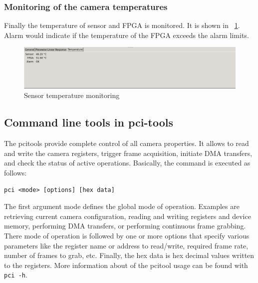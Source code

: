 \subsubsection{Monitoring of the camera temperatures}

Finally the temperature of sensor and FPGA is monitored. It is shown in  \figurename~\ref{ufo_gui_temp_bar}. Alarm would indicate if the temperature of the FPGA exceeds the alarm limits. 
\begin{figure}[h]
\centering
\includegraphics[width=\textwidth]{images/ufo_gui_temp.png}
\caption{\label{ufo_gui_temp_bar} Sensor temperature monitoring}
\end{figure}






\subsection{Command line tools in pci-tools}



The pcitools provide complete control of all camera properties. It allows to read and write the camera registers,
trigger frame acquisition, initiate DMA transfers, and check the status of active operations. Basically, the command is
executed as follows:

\begin{verbatim}
pci <mode> [options] [hex data]
\end{verbatim}

The first argument mode defines the global mode of operation. Examples are retrieving current camera configuration, 
reading and writing registers and device memory, performing DMA transfers, or performing continuous frame grabbing.  
There mode of operation is followed by one or more options that specify various parameters like the register name or address to read/write, required frame rate, number of frames to grab, etc. Finally, the hex data is hex 
decimal values written to the registers. More information about of the pcitool usage can be found 
with \verb/pci -h/. 

